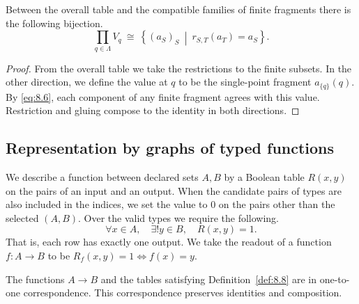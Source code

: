 \begin{lemma}\label{lem:8.7}

Between the overall table and the compatible families of finite fragments there is the
following bijection.
\begin{equation*}
\prod_{q\in\Lambda}V_q
\ \cong\
\left\{(a_S)_S\ \middle|\ r_{S,T}(a_T)=a_S\right\}.
\tag{8.7}\label{eq:8.7}
\end{equation*}

\end{lemma}

\begin{proof}

From the overall table we take the restrictions to the finite subsets.
In the other direction, we define the value at $q$ to be the single-point fragment
$a_{\{q\}}(q)$.
By \eqref{eq:8.6}, each component of any finite fragment agrees with this value.
Restriction and gluing compose to the identity in both directions.

\end{proof}

\subsection*{Representation by graphs of typed functions}

\begin{definition}\label{def:8.8}

We describe a function between declared sets $A,B$ by a Boolean table $R(x,y)$ on the pairs
of an input and an output.
When the candidate pairs of types are also included in the indices, we set the value to 0 on
the pairs other than the selected $(A,B)$.
Over the valid types we require the following.
\begin{equation*}
\forall x\in A,\quad\exists!y\in B,\quad R(x,y)=1.
\tag{8.8}\label{eq:8.8}
\end{equation*}
That is, each row has exactly one output.
We take the readout of a function $f:A\to B$ to be
$R_f(x,y)=1\Longleftrightarrow f(x)=y$.

\end{definition}

\begin{lemma}\label{lem:8.9}

The functions $A\to B$ and the tables satisfying Definition~\ref{def:8.8} are in one-to-one
correspondence.
This correspondence preserves identities and composition.

\end{lemma}

